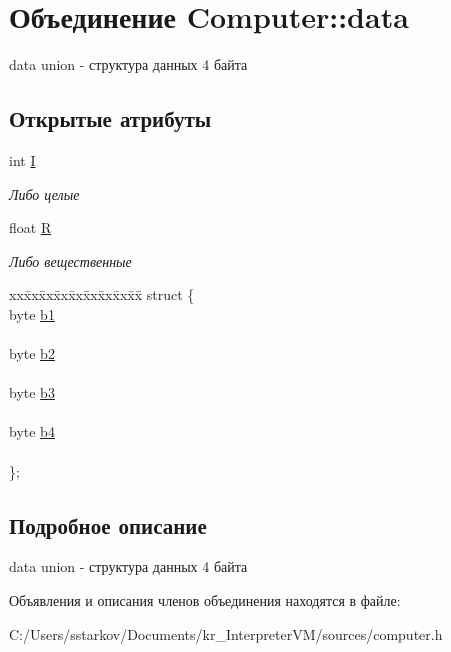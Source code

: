 \hypertarget{union_computer_1_1data}{}\section{Объединение Computer\+:\+:data}
\label{union_computer_1_1data}


data union -\/ структура данных 4 байта  


\subsection*{Открытые атрибуты}
\begin{DoxyCompactItemize}
\item 
\hypertarget{union_computer_1_1data_a6e51de6e0351adc4e50b336a092bc4bb}{}\label{union_computer_1_1data_a6e51de6e0351adc4e50b336a092bc4bb} 
int \hyperlink{union_computer_1_1data_a6e51de6e0351adc4e50b336a092bc4bb}{I}
\begin{DoxyCompactList}\small\item\em Либо целые \end{DoxyCompactList}\item 
\hypertarget{union_computer_1_1data_acbf8c96e22bd094bcbb4014818e3570d}{}\label{union_computer_1_1data_acbf8c96e22bd094bcbb4014818e3570d} 
float \hyperlink{union_computer_1_1data_acbf8c96e22bd094bcbb4014818e3570d}{R}
\begin{DoxyCompactList}\small\item\em Либо вещественные \end{DoxyCompactList}\item 
\hypertarget{union_computer_1_1data_a97dc7c0c46581c6dec0c6a961ca6abad}{}\label{union_computer_1_1data_a97dc7c0c46581c6dec0c6a961ca6abad} 
\begin{tabbing}
xx\=xx\=xx\=xx\=xx\=xx\=xx\=xx\=xx\=\kill
struct \{\\
\>byte \hyperlink{union_computer_1_1data_a4308eb86abfec2d52028212c599a093b}{b1}\\
\>\\
\>byte \hyperlink{union_computer_1_1data_a87252409c780b1c387883eb027065709}{b2}\\
\>\\
\>byte \hyperlink{union_computer_1_1data_af9265f845319a83f5877590e7ab2a497}{b3}\\
\>\\
\>byte \hyperlink{union_computer_1_1data_aca2c60d7da9da79750a6d3a237dae93c}{b4}\\
\>\\
\}; \\

\end{tabbing}\end{DoxyCompactItemize}


\subsection{Подробное описание}
data union -\/ структура данных 4 байта 

Объявления и описания членов объединения находятся в файле\+:\begin{DoxyCompactItemize}
\item 
C\+:/\+Users/sstarkov/\+Documents/kr\+\_\+\+Interpreter\+V\+M/sources/computer.\+h\end{DoxyCompactItemize}
